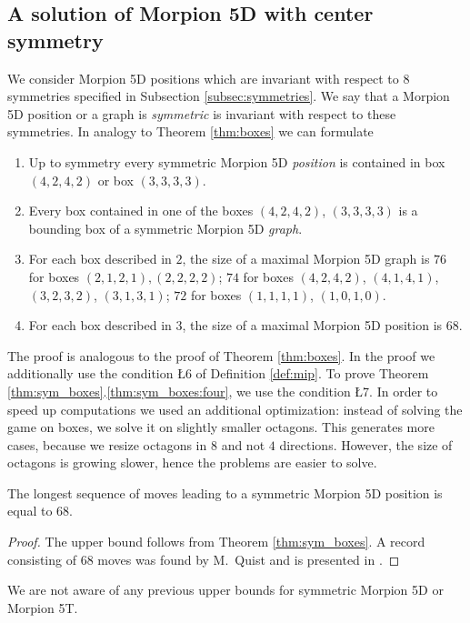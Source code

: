 \subsection{A solution of Morpion 5D with center symmetry}
We consider Morpion 5D positions which are invariant with respect to $8$ symmetries 
specified in Subsection \ref{subsec:symmetries}. We say that a Morpion 5D position or a graph is {\em symmetric} is invariant with respect to these symmetries.  
In analogy to Theorem \ref{thm:boxes} we can formulate 
\begin{theorem}
\begin{enumerate}
\item Up to symmetry every symmetric Morpion 5D {\em position} is contained in box
$(4, 2, 4, 2)$ or box $(3, 3, 3, 3)$.
\item Every box contained in one of the boxes $(4, 2, 4, 2)$, $(3, 3, 3, 3)$ is a bounding box of a symmetric Morpion 5D {\em graph}.
\item For each box described in $2$, the size of a maximal Morpion 5D graph is $76$ for boxes $(2, 1, 2, 1), (2, 2, 2, 2)$; $74$ for boxes $(4,2,4,2)$, $(4,1,4,1)$, $(3,2,3,2)$, $(3,1,3,1)$; $72$ for boxes $(1,1,1,1)$, $(1,0,1,0)$.
\item For each box described in $3$, the size of a maximal Morpion 5D position is $68$. \label{thm:sym_boxes:four}
\end{enumerate} 
\label{thm:sym_boxes}
\end{theorem}

The proof is analogous to the proof of Theorem \ref{thm:boxes}. In the proof we additionally use the condition \L{6} of Definition \ref{def:mip}. To prove Theorem \ref{thm:sym_boxes}.\ref{thm:sym_boxes:four}, we use the condition \L{7}. In order to speed up computations we used an additional optimization: instead of solving the game on boxes, we solve it on slightly smaller octagons. This generates more cases, because we resize octagons in $8$ and not $4$ directions. However, the size of octagons is growing slower, hence the problems are easier to solve.  

\begin{corollary}
\label{cor:68}
The longest sequence of moves leading to a symmetric Morpion 5D position is equal to $68$.
\end{corollary}
\begin{proof} 
The upper bound follows from Theorem \ref{thm:sym_boxes}.
A record consisting of $68$ moves was found by M.~Quist and is presented in \cite{boyer}. %
\end{proof}

We are not aware of any previous upper bounds for symmetric Morpion 5D or Morpion 5T.

